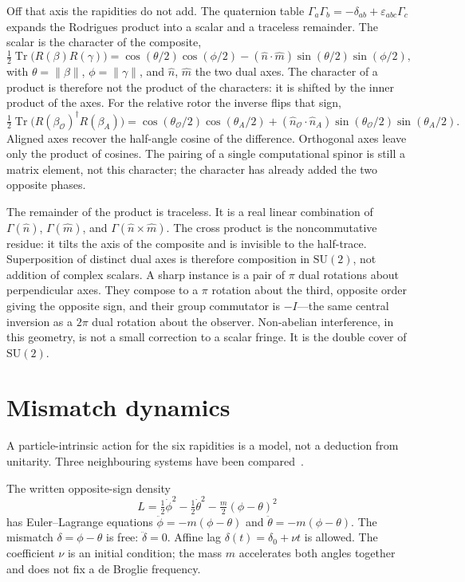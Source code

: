 \documentclass[a4paper]{article}
\begin{document}
Off that axis the rapidities do not add. The quaternion table \(\Gamma_a\Gamma_b=-\delta_{ab}+\varepsilon_{abc}\Gamma_c\) expands the Rodrigues product into a scalar and a traceless remainder. The scalar is the character of the composite,
\[
\tfrac12\operatorname{Tr}\bigl(R(\beta)R(\gamma)\bigr)
  =\cos(\theta/2)\cos(\phi/2)-(\hat n\cdot\hat m)\sin(\theta/2)\sin(\phi/2),
\]
with \(\theta=\lVert\beta\rVert\), \(\phi=\lVert\gamma\rVert\), and \(\hat n\), \(\hat m\) the two dual axes. The character of a product is therefore not the product of the characters: it is shifted by the inner product of the axes. For the relative rotor the inverse flips that sign,
\[
\tfrac12\operatorname{Tr}\bigl(R(\beta_{\mathcal{O}})^{\dagger}R(\beta_A)\bigr)
  =\cos(\theta_{\mathcal{O}}/2)\cos(\theta_A/2)+(\hat n_{\mathcal{O}}\cdot\hat n_A)\sin(\theta_{\mathcal{O}}/2)\sin(\theta_A/2).
\]
Aligned axes recover the half-angle cosine of the difference. Orthogonal axes leave only the product of cosines. The pairing of a single computational spinor is still a matrix element, not this character; the character has already added the two opposite phases.

The remainder of the product is traceless. It is a real linear combination of \(\Gamma(\hat n)\), \(\Gamma(\hat m)\), and \(\Gamma(\hat n\times\hat m)\). The cross product is the noncommutative residue: it tilts the axis of the composite and is invisible to the half-trace. Superposition of distinct dual axes is therefore composition in \(\mathrm{SU}(2)\), not addition of complex scalars. A sharp instance is a pair of \(\pi\) dual rotations about perpendicular axes. They compose to a \(\pi\) rotation about the third, opposite order giving the opposite sign, and their group commutator is \(-I\)---the same central inversion as a \(2\pi\) dual rotation about the observer. Non-abelian interference, in this geometry, is not a small correction to a scalar fringe. It is the double cover of \(\mathrm{SU}(2)\).

\section{Mismatch dynamics}

A particle-intrinsic action for the six rapidities is a model, not a deduction from unitarity. Three neighbouring systems have been compared~\cite{dst-dynamic-equation,dst-main}.

The written opposite-sign density
\[
L=\tfrac12\dot\phi^2-\tfrac12\dot\theta^2-\tfrac m2(\phi-\theta)^2
\]
has Euler--Lagrange equations \(\ddot\phi=-m(\phi-\theta)\) and \(\ddot\theta=-m(\phi-\theta)\). The mismatch \(\delta=\phi-\theta\) is free: \(\ddot\delta=0\). Affine lag \(\delta(t)=\delta_0+\nu t\) is allowed. The coefficient \(\nu\) is an initial condition; the mass \(m\) accelerates both angles together and does not fix a de Broglie frequency.
\end{document}
